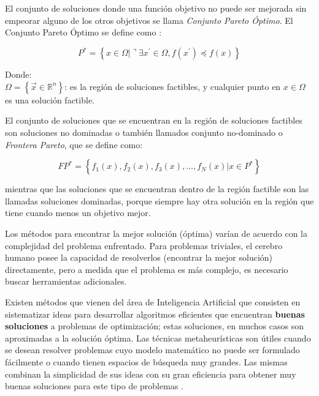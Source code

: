 El conjunto de soluciones donde una función objetivo no puede ser mejorada sin empeorar alguno de los otros objetivos se llama \textit{Conjunto Pareto Óptimo}. El Conjunto Pareto Óptimo se define como \cite{nesmachnow2004version}:

\begin{equation}\label{pareto_optimo}
    P^* = \left\{{{x}\in{ \Omega} | \urcorner \exists{{x^{\prime}}}\in{ \Omega}, {f}({x^{\prime}}) \preceq {f}({x})}\right\}
\end{equation}

Donde:\\
$\Omega = \left \{ \vec{x} \in  \mathbb{R}^n \right \}$: es la región de soluciones factibles, y cualquier punto en ${x}\in{\Omega}$ es una solución factible.


El conjunto de soluciones que se encuentran en la región de soluciones factibles son soluciones no dominadas o también llamados conjunto no-dominado o \textit{Frontera Pareto}, que se define como:

\begin{equation}\label{frente_pareto}
     FP^* = \left\{ {f_1({x}), f_2({x}),  f_3({x}), \ldots,  f_N({x}) | {x}\in{P^*} }\right\}
\end{equation}

mientras que las soluciones que se encuentran dentro de la región factible son las llamadas soluciones dominadas, porque siempre hay otra solución en la región que tiene cuando menos un objetivo mejor.

Los métodos para encontrar la mejor solución (óptima) varían de acuerdo con la complejidad del problema enfrentado. Para problemas triviales, el cerebro humano posee la capacidad de resolverlos (encontrar la mejor solución) directamente, pero a medida que el problema es más complejo, es necesario buscar herramientas adicionales.

Existen métodos que vienen del área de Inteligencia Artificial que consisten en sistematizar ideas para desarrollar algoritmos eficientes que encuentran \textbf {buenas soluciones} a problemas de optimización; estas soluciones, en muchos casos son aproximadas a la solución óptima. Las técnicas metaheurísticas son útiles cuando se desean resolver problemas cuyo modelo matemático no puede ser formulado fácilmente o cuando tienen espacios de búsqueda muy grandes. Las mismas combinan la simplicidad de sus ideas con su gran eficiencia para obtener muy buenas soluciones para este tipo de problemas \cite{cuartasmetodologia}. 

